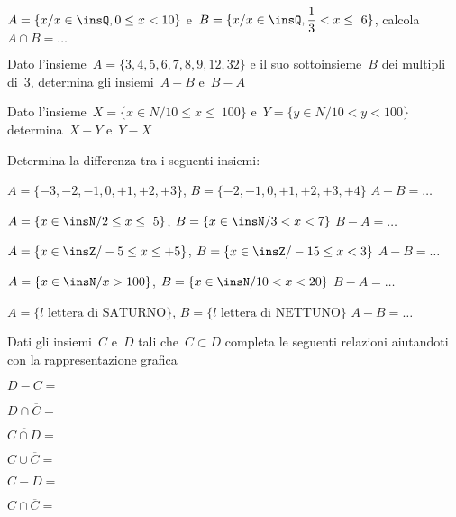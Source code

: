 \begin{esercizio}
\label{ese:7.51}
\(A=\{x/x\in \insQ,0\le x<10\}\) e~\(B=\{x/x\in \insQ,\dfrac{1}{3}<x\le~6\}\), 
calcola~\(A\cap B=\ldots\)
\end{esercizio}

\begin{esercizio}
\label{ese:7.52}
Dato l'insieme~\(A=\{3, 4, 5, 6, 7, 8, 9, 12, 32\}\) e il suo sottoinsieme~\(B\) dei 
multipli di~3, determina gli
insiemi~\(A-B\) e~\(B-A\)
\end{esercizio}

\begin{esercizio}
\label{ese:7.53}
Dato l'insieme~\(X=\{x\in N/10\le x\le~100\}\) e~\(Y=\{y\in N/10<y<100\}\) 
determina~\(X-Y\) e~\(Y-X\)
\end{esercizio}

\begin{esercizio}
\label{ese:7.54}
Determina la differenza tra i seguenti insiemi:
\vspace{-6pt}
\begin{enumeratea}
 \item \(A=\{-3,-2,-1,0,+1,+2,+3\}\), \(B=\{-2,-1,0,+1,+2,+3,+4\}\) \(A-B=\ldots\)
\item \(A=\{x\in\insN/2\le x\le~5\}\), \(B=\{x\in\insN/3<x<7\}\) \(B-A=\ldots\)
\item \(A=\{x\in\insZ/-5\le x\le +5\}\), \(B=\{x\in\insZ/-15\le x<3\}\) \(A-B=\ldots\)
\item \(A=\{x\in\insN/x>100\}\), \(B=\{x\in \insN/10<x<20\}\) \(B-A=\ldots\)
\item \(A=\{l\text{ lettera di SATURNO}\}\), \(B=\{l\text{ lettera di NETTUNO}\}\) 
\(A-B=\ldots\)
\end{enumeratea}
\end{esercizio}

\newpage %

\begin{esercizio}
\label{ese:7.55}
Dati gli insiemi~\(C\) e~\(D\) tali che~\(C\subset D\)
completa le seguenti relazioni aiutandoti con la rappresentazione
grafica
\vspace{-6pt}
\begin{multicols}{3}
\begin{enumeratea}
\item \(D-C=\)
\item \(D\cap \overline{C}=\)
\item \(\overline{{C\cap D}}=\)
\item \(C\cup \overline{C}=\)
\item \(C-D=\)
\item \(C\cap \overline{C}=\)
\end{enumeratea}
\end{multicols}
\end{esercizio}

